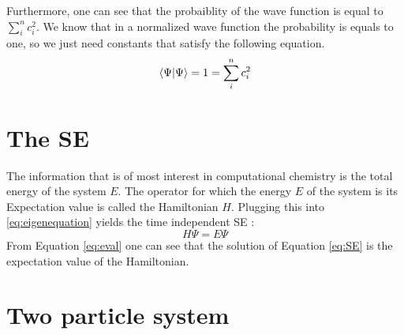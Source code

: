 \documentclass[../master_thesis.tex]{subfiles}
\begin{document}
Furthermore, one can see that the probaiblity of the wave function is equal to
$\sum_i^nc_i^2$. We know that in a normalized wave function the
probability is equals to one, so we just need constants that satisfy the
following equation.
\begin{equation}
  \braket{\Psi|\Psi} = 1 = \sum\limits_i^nc_i^2\label{eq:arbprob}
\end{equation}


\section{The \ac{SE}}
The information that is of most interest in computational chemistry is the
total energy of the system $ E $. The operator for which the energy $E$ of the
system is its Expectation value is called the Hamiltonian $H$. Plugging this
into \ref{eq:eigenequation} yields the time independent \ac{SE}
\cite{Cramer:2004, Jensen:2017}:
\begin{equation}
  H\Psi = E\Psi\label{eq:SE}
\end{equation}
From Equation \ref{eq:eval} one can see that the solution of Equation
\ref{eq:SE} is the expectation value of the Hamiltonian.



\section{Two particle system}
\end{document}
